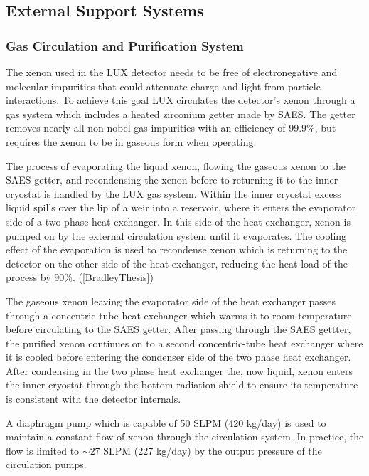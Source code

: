 \documentclass[a4paper,12pt]{article}
\begin{document}
\subsection{External Support Systems}

\subsubsection{Gas Circulation and Purification System} \label{GasSystem}
The xenon used in the LUX detector needs to be free of electronegative and molecular impurities that could attenuate charge and light from particle interactions.  To achieve this goal LUX circulates the detector’s xenon through a gas system which includes a heated zirconium getter made by SAES.  The getter removes nearly all non-nobel gas impurities with an efficiency of 99.9\%, but requires the xenon to be in gaseous form when operating.  

The process of evaporating the liquid xenon, flowing the gaseous xenon to the SAES getter, and recondensing the xenon before to returning it to the inner cryostat is handled by the LUX gas system. Within the inner cryostat excess liquid spills over the lip of a weir into a reservoir, where it enters the evaporator side of a two phase heat exchanger.  In this side of the heat exchanger, xenon is pumped on by the external circulation system until it evaporates. The cooling effect of the evaporation is used to recondense xenon which is returning to the detector on the other side of the heat exchanger, reducing the heat load of the process by 90\%. (\ref{BradleyThesis})


The gaseous xenon leaving the evaporator side of the heat exchanger passes through a concentric-tube heat exchanger which warms it to room temperature before circulating to the SAES getter.  After passing through the SAES gettter, the purified xenon continues on to a second concentric-tube heat exchanger where it is cooled before entering the condenser side of the two phase heat exchanger.  After condensing in the two phase heat exchanger the, now liquid, xenon enters the inner cryostat through the bottom radiation shield to ensure its temperature is consistent with the detector internals.

A diaphragm pump which is capable of 50 SLPM (420 kg/day) is used to maintain a constant flow of xenon through the circulation system.  In practice, the flow is limited to $\sim$27 SLPM (227 kg/day) by the output pressure of the circulation pumps. 
\end{document}
